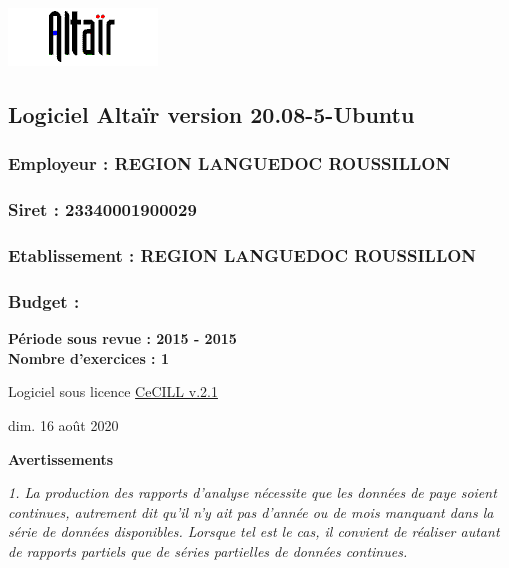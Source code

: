 \includegraphics{icones/altair.png}

\hypertarget{logiciel-altair-version-20.08-5-ubuntu}{%
\subsection{Logiciel Altaïr version
20.08-5-Ubuntu}\label{logiciel-altair-version-20.08-5-ubuntu}}

\hypertarget{employeur-region-languedoc-roussillon}{%
\subsubsection{Employeur : REGION LANGUEDOC
ROUSSILLON}\label{employeur-region-languedoc-roussillon}}

\hypertarget{siret-23340001900029}{%
\subsubsection{Siret : 23340001900029}\label{siret-23340001900029}}

\hypertarget{etablissement-region-languedoc-roussillon}{%
\subsubsection{Etablissement : REGION LANGUEDOC
ROUSSILLON}\label{etablissement-region-languedoc-roussillon}}

\hypertarget{budget}{%
\subsubsection{Budget :}\label{budget}}

\textbf{Période sous revue : 2015 - 2015 }\\
\textbf{Nombre d'exercices : 1 }

Logiciel sous licence \href{../Docs/LICENCE.html}{CeCILL v.2.1}

dim. 16 août 2020

\textbf{Avertissements}

\emph{1. La production des rapports d'analyse nécessite que les données
de paye soient continues, autrement dit qu'il n'y ait pas d'année ou de
mois manquant dans la série de données disponibles. Lorsque tel est le
cas, il convient de réaliser autant de rapports partiels que de séries
partielles de données continues.}

